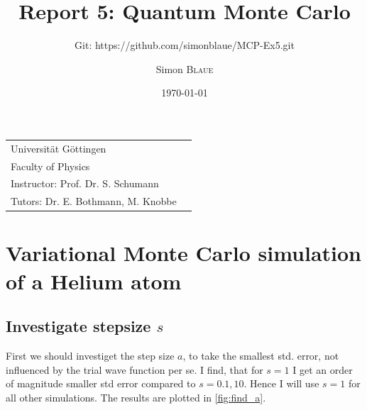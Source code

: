\documentclass[
	a4paper, %
	10pt, %
]{CSUniSchoolLabReport}
\title{Report 5: Quantum Monte Carlo} %
\subtitle{Git: https://github.com/simonblaue/MCP-Ex5.git}
\author{Simon \textsc{Blaue}} %
\date{\today} %
\begin{document}
\maketitle %

\vspace*{40px}

\begin{tabular}{l r}
	Universität Göttingen \\ %
	Faculty of Physics \\
	Instructor: Prof. Dr. S. Schumann \\
	Tutors: Dr. E. Bothmann, M. Knobbe \\ %
\end{tabular}



\newpage

\ohead{\pagemark}

\section{Variational Monte Carlo simulation of a Helium atom}

\subsection{Investigate stepsize $s$}

First we should investiget the step size $a$, to take the smallest std. error, not influenced by the trial wave function per se. I find, that for $s=1$ I get an order of magnitude smaller std error compared to $s=0.1, 10$. Hence I will use $s=1$ for all other simulations. The results are plotted in \autoref{fig:find_a}.
\end{document}
